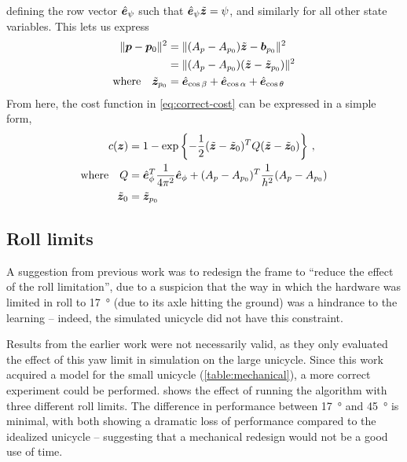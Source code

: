 \documentclass[main.tex]{subfiles}
\begin{document}
	defining the row vector $\hat{\bm{e}}_{\psi}$ such that $\hat{\bm{e}}_{\psi}\tilde{\bm{z}} = \psi$, and similarly for all other state variables.
	This lets us express
	\begin{align}
		\|\bm{p} - \bm{p}_0\|^2
			&= \|(A_p - A_{p_0})\tilde{\bm{z}} - \bm{b}_{p_0}\|^2  \nonumber \\
			&= \|(A_p - A_{p_0})(\tilde{\bm{z}} - \tilde{\bm{z}}_{p_0})\|^2 \\
		\text{where}\quad\tilde{\bm{z}}_{p_0}
			&= \hat{\bm{e}}_{\cos \beta} + \hat{\bm{e}}_{\cos \alpha} + \hat{\bm{e}}_{\cos \theta}  \nonumber
	\end{align}
	From here, the cost function in \cref{eq:correct-cost} can be expressed in a simple form,
	\begin{align}
		c(\bm z) &= 1 - \exp\left\{-\frac{1}{2}
			(\tilde{\bm{z}} - \tilde{\bm{z}}_0)^T  Q (\tilde{\bm{z}} - \tilde{\bm{z}}_0)
		\right\} \,, \label{eq:quad-cost} \\
		\text{where}\quad Q &=
			\hat{\bm{e}}_{\phi}^T\frac{1}{4\pi^2}\hat{\bm{e}}_{\phi} +
			(A_p - A_{p_0})^T\frac{1}{h^2}(A_p - A_{p_0}) \nonumber \\
			\tilde{\bm{z}}_0 &= \tilde{\bm{z}}_{p_0} \nonumber
	\end{align}

\subsection{Roll limits}
	\label{sec:roll-cost}
	A suggestion from previous work was to redesign the frame to \enquote{reduce the effect of the roll limitation}\cite[p.~35]{aleksi}, due to a suspicion that the way in which the hardware was limited in roll to \SI{17}{\degree} (due to its axle hitting the ground) was a hindrance to the learning -- indeed, the simulated unicycle did not have this constraint.

	Results from the earlier work were not necessarily valid, as they only evaluated the effect of this yaw limit in simulation on the large unicycle.
	Since this work acquired a model for the small unicycle (\cref{table:mechanical}), a more correct experiment could be performed.
	 shows the effect of running the algorithm with three different roll limits.
	The difference in performance between \SI{17}{\degree} and \SI{45}{\degree} is minimal, with both showing a dramatic loss of performance compared to the idealized unicycle -- suggesting that a mechanical redesign would not be a good use of time.
\end{document}
